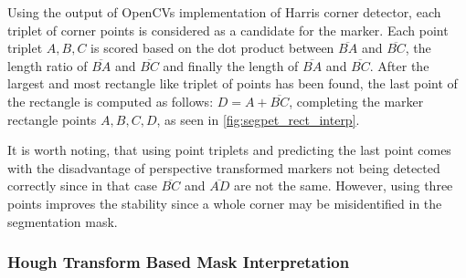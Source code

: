 \documentclass[10pt]{book}
\begin{document}
Using the output of \acp{OpenCV} implementation of Harris corner detector, each triplet of corner points is considered as a candidate for the marker. Each point triplet $A,B,C$ is scored based on the dot product between $\overline{BA}$ and $\overline{BC}$, the length ratio of $\overline{BA}$ and $\overline{BC}$ and finally the length of $\overline{BA}$ and $\overline{BC}$. After the largest and most rectangle like triplet of points has been found, the last point of the rectangle is computed as follows: $D = A + \overline{BC}$, completing the marker rectangle points $A,B,C,D$, as seen in \autoref{fig:segpet_rect_interp}. 

It is worth noting, that using point triplets and predicting the last point comes with the disadvantage of perspective transformed markers not being detected correctly since in that case $\overline{BC}$ and $\overline{AD}$ are not the same. However, using three points improves the stability since a whole corner may be misidentified in the segmentation mask.


\subsubsection{Hough Transform Based Mask Interpretation}
\end{document}
